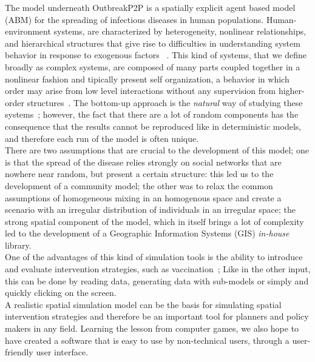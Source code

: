 \documentclass[printer]{tGIS2e}
\begin{document}
The model underneath OutbreakP2P is a spatially explicit agent based model (ABM) for the spreading of infectious diseases in human populations. Human-environment systems, are characterized by heterogeneity, nonlinear relationships, and hierarchical structures that give rise to difficulties in understanding system behavior in response to exogenous factors ~\citep{Li2005}. This kind of systems, that we define broadly as complex systems, are composed of many parts coupled together in a nonlinear fashion and tipically present self organization, a behavior in which order may arise from low level interactions without any supervision from higher-order structures~\citep{Nowak1996}. The bottom-up approach is the \textit{natural} way of studying these systems~\citep{Simoes2007}; however, the fact that there are a lot of random components has the consequence that the results cannot be reproduced like in deterministic models, and therefore each run of the model is often unique.\\
There are two assumptions that are crucial to the development of this model; one is that the spread of the disease relies strongly on social networks that are  nowhere near random, but present a certain structure: this led us to the development of a community model; the other was to relax the common assumptions of homogeneous mixing in an homogenous space and create a scenario with an irregular distribution of individuals in an irregular space; the strong spatial component of the model, which in itself brings a lot of complexity led to the development of a Geographic Information Systems (GIS) \textit{in-house} library.\\
One of the advantages of this kind of simulation tools is the ability to introduce and evaluate intervention strategies, such as vaccination~\citep{Simoes2007}; Like in the other input, this can be done by reading data, generating data with sub-models or simply and quickly clicking on the screen.\\
A realistic spatial simulation model can be the basis for simulating spatial intervention strategies and therefore be an important tool for planners and policy makers in any field. Learning the lesson from computer games, we also hope to have created a software that is easy to use by non-technical users, through a user-friendly user interface.\\



\end{document}
